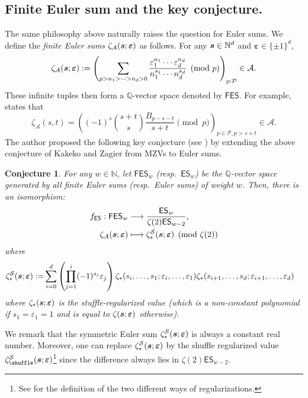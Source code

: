\documentclass{article}
\newcommand{\FES}{\mathsf {FES}}
\newcommand{\ES}{\mathsf {ES}}
\newcommand{\sha}{\shuffle}
\newcommand{\Sy}{{\mathcal S}}
\newcommand\eps{{\varepsilon}}
\newcommand{\bfs}{{\boldsymbol{\sl{s}}}}
\newcommand\bfeps{{\boldsymbol \varepsilon}}
\newcommand{\calA}{\mathcal{A}}
\newcommand{\calP}{\mathcal{P}}
\newcommand{\N}{\mathbb{N}}
\newcommand{\Q}{\mathbb{Q}}
\theoremstyle{plain}
\newtheorem{conj}[thm]{Conjecture}
\theoremstyle{definition}
\begin{document}
\subsection{Finite Euler sum and the key conjecture.}
The same philosophy above naturally raises the question for Euler sums. We define the \emph{finite Euler sums} $\zeta_\calA(\bfs;\bfeps)$ as follows. For any $\bfs\in\N^d$ and $\bfeps\in\{\pm 1\}^d$,
\begin{equation}\label{equ:FMZdepth2}
\zeta_\calA(\bfs;\bfeps):=\left( \sum_{p>n_1>\dots>n_d>0}  \frac{\eps_1^{n_1}\cdots \eps_d^{n_d}}{n_1^{s_1}\cdots n_d^{s_d}} \pmod{p}\right)_{p: \calP}\in \calA.
\end{equation}
These infinite tuples then form a $\Q$-vector space denoted by $\FES$. For example, \cite[Thm. 3.1]{Zhao2008a} states that
\begin{equation}\label{equ:FMZVdepth2}
\zeta_\calA(s,t)=\left( (-1)^s \binom{s+t}{s} \frac{B_{p-s-t}}{s+t} \pmod{p} \right)_{p\in\calP,p>s+t}\in \calA.
\end{equation}
The author proposed the following key conjecture
(see \cite[Conjecture~8.6.9]{Zhao2016}) by extending the above conjecture of Kakeko and Zagier from MZVs to Euler sums.

\begin{conj}\label{conj:KanekoZagierAltVersion}
For any $w\in\N$, let $\FES_{w}$ (resp.\ $\ES_w$) be the $\Q$-vector space generated by
all finite Euler sums (resp.\ Euler sums) of weight $w$. Then, there is an isomorphism:
\begin{align}
f_\ES: \FES_{w} & \longrightarrow \frac{\ES_w}{\zeta(2)\ES_{w-2}} , \notag\\
 \zeta_{\calA}(\bfs;\bfeps) & \longmapsto \zeta_\ast^\Sy(\bfs;\bfeps)  \pmod{\zeta(2)}   \label{equ:defn_f_ES}
\end{align}
where
\begin{align*}
\zeta_\ast^\Sy(\bfs;\bfeps):=&\sum_{i=0}^d
\left(\prod_{j=1}^i (-1)^{s_j} \eps_j \right) \zeta_\ast(s_i,\dots,s_1;\eps_i,\dots,\eps_1) \zeta_\ast(s_{i+1},\dots,s_d;\eps_{i+1},\dots,\eps_d)
\end{align*}
where $\zeta_\ast(\bfs;\bfeps)$ is the stuffle-regularized value (which is a non-constant polynomial if $s_1=\eps_1=1$ and is equal to $\zeta(\bfs;\bfeps)$ otherwise).
\end{conj}
We remark that the symmetric Euler sum $\zeta_\ast^\Sy(\bfs;\bfeps)$ is always a constant real number. Moreover,
one can replace $\zeta_\ast^\Sy(\bfs;\bfeps)$ by the shuffle regularized value $\zeta_\sha^\Sy(\bfs;\bfeps)$\footnote{See \cite[\S 13.3.1]{Zhao2016} for the definition of the two different ways of regularizations.}
since the difference always lies in $\zeta(2)\ES_{w-2}$.
\end{document}

